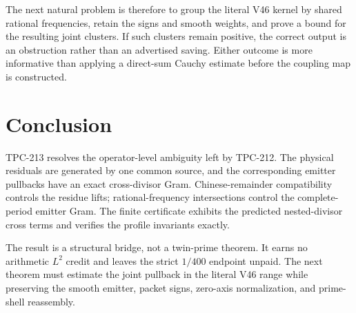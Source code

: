 \documentclass[11pt]{article}
\theoremstyle{definition}
\theoremstyle{remark}
\begin{document}
The next natural problem is therefore to group the literal V46 kernel by shared
rational frequencies, retain the signs and smooth weights, and prove a bound
for the resulting joint clusters.  If such clusters remain positive, the
correct output is an obstruction rather than an advertised saving.  Either
outcome is more informative than applying a direct-sum Cauchy estimate before
the coupling map is constructed.

\section{Conclusion}

TPC-213 resolves the operator-level ambiguity left by TPC-212.  The physical
residuals are generated by one common source, and the corresponding emitter
pullbacks have an exact cross-divisor Gram.  Chinese-remainder compatibility
controls the residue lifts; rational-frequency intersections control the
complete-period emitter Gram.  The finite certificate exhibits the predicted
nested-divisor cross terms and verifies the profile invariants exactly.

The result is a structural bridge, not a twin-prime theorem.  It earns no
arithmetic $L^2$ credit and leaves the strict $1/400$ endpoint unpaid.  The
next theorem must estimate the joint pullback in the literal V46 range while
preserving the smooth emitter, packet signs, zero-axis normalization, and
prime-shell reassembly.



\end{document}

